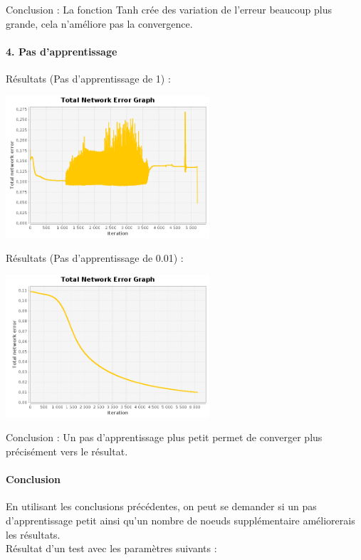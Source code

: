 \documentclass[10pt]{report}
\begin{document}
Conclusion : La fonction Tanh crée des variation de l'erreur beaucoup plus grande, cela n'améliore pas la convergence.

\paragraph{4. Pas d'apprentissage}

Résultats (Pas d'apprentissage de 1) :\\
\begin{center}
\includegraphics[height=200px]{img/EQ_EG_10.png}\\
\end{center}

Résultats (Pas d'apprentissage de 0.01) :\\
\begin{center}
\includegraphics[height=200px]{img/EQ_EG_11.png}\\
\end{center}

Conclusion : Un pas d'apprentissage plus petit permet de converger plus précisément vers le résultat.

\paragraph{Conclusion}
En utilisant les conclusions précédentes, on peut se demander si un pas d'apprentissage petit ainsi qu'un nombre de noeuds supplémentaire améliorerais les résultats.\\
Résultat d'un test avec les paramètres suivants :\\
\end{document}
